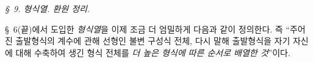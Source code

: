 
\begin{center}
\emph{\S\ 9. 형식열. 환원 정리}.
\end{center}
\S\ 6(끝)에서 도입한 \emph{형식열}을 이제 조금 더 엄밀하게 다음과 같이 정의한다. 즉 “주어진 출발형식의 계수에 관해 선형인 불변 구성식 전체, 다시 말해 출발형식을 자기 자신에 대해 수축하여 생긴 형식 전체를 \emph{더 높은 형식에 따른 순서로 배열한 것}”이다.

